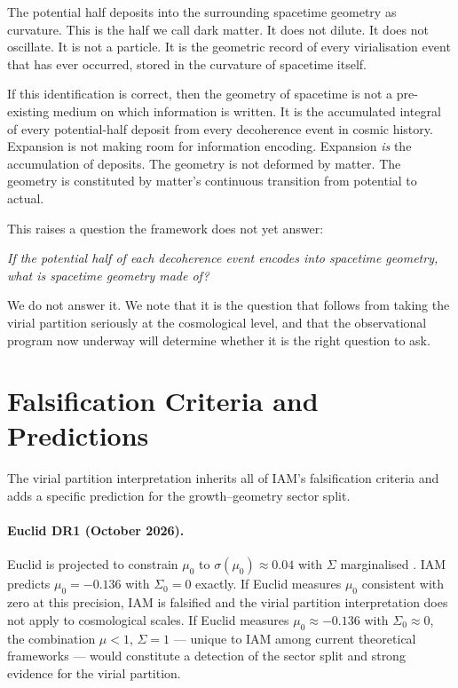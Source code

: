 \documentclass[12pt,a4paper]{article}
\begin{document}
The potential half deposits into the surrounding spacetime geometry as
curvature. This is the half we call dark matter. It does not dilute. It does
not oscillate. It is not a particle. It is the geometric record of every
virialisation event that has ever occurred, stored in the curvature of
spacetime itself.

If this identification is correct, then the geometry of spacetime is not a
pre-existing medium on which information is written. It is the accumulated
integral of every potential-half deposit from every decoherence event in
cosmic history. Expansion is not making room for information encoding.
Expansion \textit{is} the accumulation of deposits. The geometry is not
deformed by matter. The geometry is constituted by matter's continuous
transition from potential to actual.

This raises a question the framework does not yet answer:

\textit{If the potential half of each decoherence event encodes into
spacetime geometry, what is spacetime geometry made of?}

We do not answer it. We note that it is the question that follows from taking
the virial partition seriously at the cosmological level, and that the
observational program now underway will determine whether it is the right
question to ask.

\section{Falsification Criteria and Predictions}
\label{sec:falsification}

The virial partition interpretation inherits all of IAM's falsification
criteria \citep{mahaffey2026} and adds a specific prediction for the
growth--geometry sector split.

\paragraph{Euclid DR1 (October 2026).}
Euclid is projected to constrain $\mu_0$ to $\sigma(\mu_0) \approx 0.04$ with
$\Sigma$ marginalised \citep{euclid2020}. IAM predicts $\mu_0 = -0.136$ with
$\Sigma_0 = 0$ exactly. If Euclid measures $\mu_0$ consistent with zero at
this precision, IAM is falsified and the virial partition interpretation does
not apply to cosmological scales. If Euclid measures $\mu_0 \approx -0.136$
with $\Sigma_0 \approx 0$, the combination $\mu < 1$, $\Sigma = 1$ --- unique
to IAM among current theoretical frameworks --- would constitute a detection of
the sector split and strong evidence for the virial partition.
\end{document}
